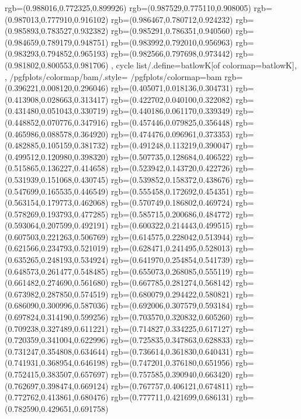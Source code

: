 {{{			rgb=(0.988016,0.772325,0.899926)
			rgb=(0.987529,0.775110,0.908005)
			rgb=(0.987013,0.777910,0.916102)
			rgb=(0.986467,0.780712,0.924232)
			rgb=(0.985893,0.783527,0.932382)
			rgb=(0.985291,0.786351,0.940560)
			rgb=(0.984659,0.789179,0.948751)
			rgb=(0.983992,0.792010,0.956963)
			rgb=(0.983293,0.794852,0.965193)
			rgb=(0.982566,0.797698,0.973442)
			rgb=(0.981802,0.800553,0.981706)
		},
	cycle list/.define={batlowK}{[of colormap=batlowK]},
	},
	/pgfplots/colormap/bam/.style={
		/pgfplots/colormap={bam}{%
			rgb=(0.396221,0.008120,0.296046)
			rgb=(0.405071,0.018136,0.304731)
			rgb=(0.413908,0.028663,0.313417)
			rgb=(0.422702,0.040100,0.322082)
			rgb=(0.431480,0.051043,0.330719)
			rgb=(0.440186,0.061170,0.339349)
			rgb=(0.448852,0.070776,0.347916)
			rgb=(0.457446,0.079825,0.356448)
			rgb=(0.465986,0.088578,0.364920)
			rgb=(0.474476,0.096961,0.373353)
			rgb=(0.482885,0.105159,0.381732)
			rgb=(0.491248,0.113219,0.390047)
			rgb=(0.499512,0.120980,0.398320)
			rgb=(0.507735,0.128684,0.406522)
			rgb=(0.515865,0.136227,0.414658)
			rgb=(0.523942,0.143720,0.422726)
			rgb=(0.531939,0.151068,0.430745)
			rgb=(0.539852,0.158372,0.438676)
			rgb=(0.547699,0.165535,0.446549)
			rgb=(0.555458,0.172692,0.454351)
			rgb=(0.563154,0.179773,0.462068)
			rgb=(0.570749,0.186802,0.469724)
			rgb=(0.578269,0.193793,0.477285)
			rgb=(0.585715,0.200686,0.484772)
			rgb=(0.593064,0.207599,0.492191)
			rgb=(0.600322,0.214443,0.499515)
			rgb=(0.607503,0.221263,0.506769)
			rgb=(0.614575,0.228042,0.513944)
			rgb=(0.621566,0.234793,0.521019)
			rgb=(0.628471,0.241495,0.528013)
			rgb=(0.635265,0.248193,0.534924)
			rgb=(0.641970,0.254854,0.541739)
			rgb=(0.648573,0.261477,0.548485)
			rgb=(0.655073,0.268085,0.555119)
			rgb=(0.661482,0.274690,0.561680)
			rgb=(0.667785,0.281274,0.568142)
			rgb=(0.673982,0.287850,0.574519)
			rgb=(0.680079,0.294422,0.580821)
			rgb=(0.686090,0.300996,0.587036)
			rgb=(0.692006,0.307579,0.593184)
			rgb=(0.697824,0.314190,0.599256)
			rgb=(0.703570,0.320832,0.605260)
			rgb=(0.709238,0.327489,0.611221)
			rgb=(0.714827,0.334225,0.617127)
			rgb=(0.720359,0.341004,0.622996)
			rgb=(0.725835,0.347863,0.628833)
			rgb=(0.731247,0.354808,0.634644)
			rgb=(0.736614,0.361830,0.640431)
			rgb=(0.741931,0.368954,0.646198)
			rgb=(0.747201,0.376180,0.651956)
			rgb=(0.752415,0.383507,0.657697)
			rgb=(0.757585,0.390940,0.663420)
			rgb=(0.762697,0.398474,0.669124)
			rgb=(0.767757,0.406121,0.674811)
			rgb=(0.772762,0.413861,0.680476)
			rgb=(0.777711,0.421699,0.686131)
			rgb=(0.782590,0.429651,0.691758)
}}}
